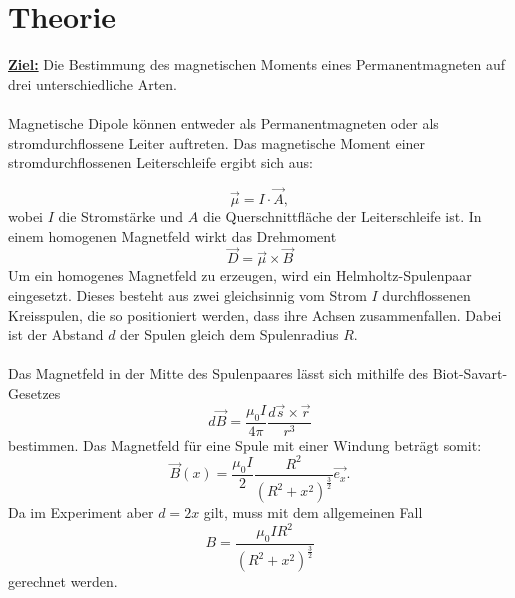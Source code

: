\section{Theorie \cite{sample}}

\textbf{\underline{Ziel:}}
Die Bestimmung des magnetischen Moments eines Permanentmagneten auf drei unterschiedliche Arten.
\\
\\
Magnetische Dipole können entweder als Permanentmagneten oder als stromdurchflossene Leiter auftreten.
Das magnetische Moment einer stromdurchflossenen Leiterschleife ergibt sich aus:

\begin{equation}
  \vec{\mu} = I \cdot \vec{A},
\end{equation}
wobei $I$ die Stromstärke und $A$ die Querschnittfläche der Leiterschleife ist.
In einem homogenen Magnetfeld wirkt das Drehmoment
\begin{equation}
  \vec{D} = \vec{\mu} \times \vec{B}
\end{equation}
Um ein homogenes Magnetfeld zu erzeugen, wird ein Helmholtz-Spulenpaar eingesetzt.
Dieses besteht aus zwei gleichsinnig vom Strom $I$ durchflossenen Kreisspulen, die so positioniert werden,
dass ihre Achsen zusammenfallen.
Dabei ist der Abstand $d$ der Spulen gleich dem Spulenradius $R$.
\\
\\
Das Magnetfeld in der Mitte des Spulenpaares lässt sich mithilfe des Biot-Savart-Gesetzes
\begin{equation}
  d\vec{B} = \frac{\mu_0 I}{4 \pi} \frac{d\vec{s} \times \vec{r}}{r^3}
\end{equation}
bestimmen.
Das Magnetfeld für eine Spule mit einer Windung beträgt somit:
\begin{equation}
  \vec{B}(x) = \frac{\mu_0 I}{2} \frac{R^2}{(R^2 + x^2)^{\frac{3}{2}}} \vec{e_x}.
\end{equation}
Da im Experiment aber $d = 2x$ gilt, muss mit dem allgemeinen Fall
\begin{equation}
  B = \frac{\mu_0 I R^2}{(R^2 + x^2)^{\frac{3}{2}}}
  \label{eqn:bfeld}
\end{equation}
gerechnet werden.
